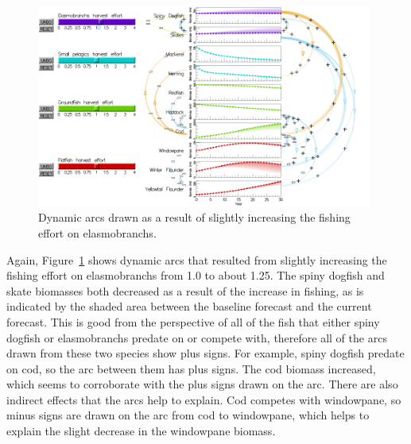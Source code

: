 \begin{figure}[h]
	\centering
	\includegraphics[width=0.98\textwidth]{figures/png/arcs_dynamic.png}
	\caption[Dynamic arcs drawn as a result of slightly increasing the fishing effort on elasmobranchs]{Dynamic arcs drawn as a result of slightly increasing the fishing effort on elasmobranchs.}
	\label{fig:arcs_dynamic}
\end{figure}

Again, Figure~\ref{fig:arcs_dynamic} shows dynamic arcs that resulted from slightly increasing the fishing effort on elasmobranchs from 1.0 to about 1.25.  The spiny dogfish and skate biomasses both decreased as a result of the increase in fishing, as is indicated by the shaded area between the baseline forecast and the current forecast.  This is good from the perspective of all of the fish that either spiny dogfish or elasmobranchs predate on or compete with, therefore all of the arcs drawn from these two species show plus signs.  For example, spiny dogfish predate on cod, so the arc between them has plus signs.  The cod biomass increased, which seems to corroborate with the plus signs drawn on the arc.  There are also indirect effects that the arcs help to explain.  Cod competes with windowpane, so minus signs are drawn on the arc from cod to windowpane, which helps to explain the slight decrease in the windowpane biomass.

